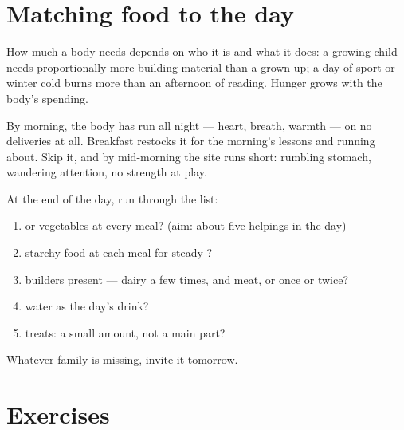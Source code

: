 \section{Matching food to the day}

\begin{proposition}\label{prop:g3:balanced-diet:needs}
How much  a body needs depends on who it is and what it
does: a growing child needs proportionally more building
material than a grown-up; a day of sport or winter cold burns
more  than an afternoon of reading. Hunger grows with the
body's spending.
\end{proposition}
\admitted

\begin{example}\label{ex:g3:balanced-diet:breakfast}
By morning, the body has run all night --- heart, breath,
warmth --- on no deliveries at all. Breakfast restocks it for
the morning's lessons and running about. Skip it, and by
mid-morning the site runs short: rumbling stomach, wandering
attention, no strength at play.
\end{example}

\begin{method}\label{met:g3:balanced-diet:check}
At the end of the day, run through the list:
\begin{enumerate}
  \item {} or vegetables at every meal? (aim: about five
        helpings in the day)
  \item starchy food at each meal for steady ?
  \item builders present --- dairy a few times, and meat, 
        or  once or twice?
  \item water as the day's drink?
  \item treats: a small amount, not a main part?
\end{enumerate}
Whatever family is missing, invite it tomorrow.
\end{method}

\section{Exercises}

